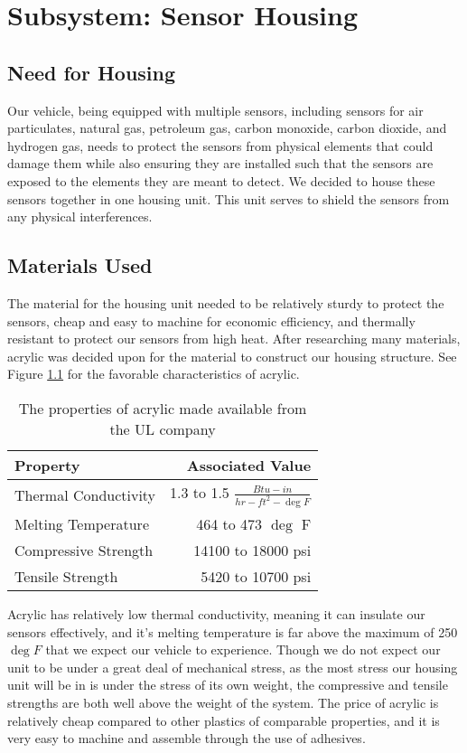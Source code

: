 \chapter{Subsystem: Sensor Housing}

\section{Need for Housing} Our vehicle, being equipped with multiple sensors, including sensors for air particulates, natural gas, petroleum gas, carbon monoxide, carbon dioxide, and hydrogen gas, needs to protect the sensors from physical elements that could damage them while also ensuring they are installed such that the sensors are exposed to the elements they are meant to detect. We decided to house these sensors together in one housing unit. This unit serves to shield the sensors from any physical interferences.

\section{Materials Used} The material for the housing unit needed to be relatively sturdy to protect the sensors, cheap and easy to machine for economic efficiency, and thermally resistant to protect our sensors from high heat. After researching many materials, acrylic was decided upon for the material to construct our housing structure. See Figure \ref{tab:Acrylic Properties} for the favorable characteristics of acrylic. 

\begin{table}
\centering
\begin{tabular}{l|r}
Property & Associated Value \\\hline
Thermal Conductivity & 1.3 to 1.5 $\frac{Btu-in}{hr-ft^2-\deg F}$ \\
Melting Temperature & 464 to 473 $\deg$ F \\
Compressive Strength & 14100 to 18000 psi \\
Tensile Strength & 5420 to 10700 psi \\
\end{tabular}
\caption{\label{tab:Acrylic Properties} The properties of acrylic made available from the UL company}
\end{table}

Acrylic has relatively low thermal conductivity, meaning it can insulate our sensors effectively, and it's melting temperature is far above the maximum of 250$\deg F$ that we expect our vehicle to experience. Though we do not expect our unit to be under a great deal of mechanical stress, as the most stress our housing unit will be in is under the stress of its own weight, the compressive and tensile strengths are both well above the weight of the system. The price of acrylic is relatively cheap compared to other plastics of comparable properties, and it is very easy to machine and assemble through the use of adhesives.

